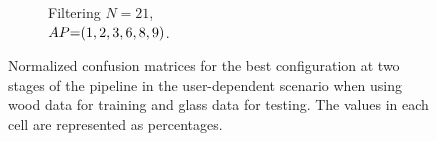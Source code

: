 \begin{figure}[ht]
\begin{subfigure}{.49\textwidth}
    \vspace{-5pt}
    \captionsetup{width=.99\linewidth}
    \caption{Filtering $N{=}21$, \\ $\splitatcommas{AP{=}(1, 2, 3, 6, 8, 9)}$.}
    \label{fig:radar-experiments:through-materials:wood-glass-confusion:filtering-ud}
  \end{subfigure}
  
  \vspace{-6pt}
  \caption{Normalized confusion matrices for the best configuration at two stages of the pipeline in the user-dependent scenario when using wood data for training and glass data for testing. The values in each cell are represented as percentages.}
  \label{fig:radar-experiments:through-materials:wood-glass-confusion}
\end{figure}



